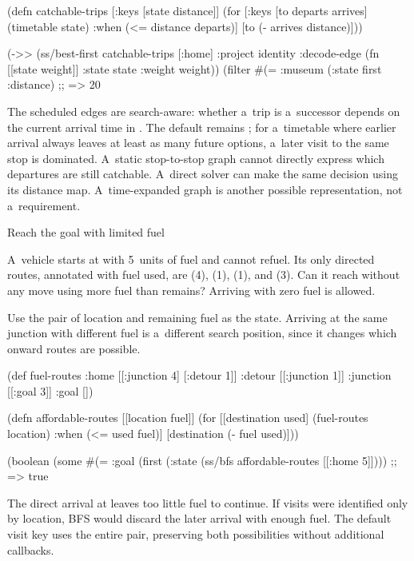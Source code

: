 {{{(defn catchable-trips [{:keys [state distance]}]
  (for [{:keys [to departs arrives]} (timetable state)
        :when (<= distance departs)]
    [to (- arrives distance)]))

(->> (ss/best-first catchable-trips [:home]
                        {:project identity
                         :decode-edge (fn [[state weight]]
                                        {:state state :weight weight})})
     (filter #(= :museum (:state %
     first
     :distance)
;; => 20
\endtt

The scheduled edges are search-aware: whether a~trip is a~successor depends
on the current arrival time in . The default
 remains ; for a~timetable where earlier arrival
always leaves at least as many future options, a~later visit to the same stop
is dominated. A~static stop-to-stop graph cannot directly express which
departures are still catchable. A~direct solver can make the same decision
using its distance map. A~time-expanded
graph is another possible representation, not a~requirement.

\secc Reach the goal with limited fuel

 A~vehicle starts at  with 5~units of
fuel and cannot refuel. Its only directed routes, annotated with fuel used,
are
 (4),  (1),
 (1), and  (3).
Can it reach  without any move using more fuel than remains?
Arriving with zero fuel is allowed.

\smallskip
{} Use the pair of location and remaining fuel as
the state. Arriving at the same junction with different fuel is a~different
search position, since it changes which onward routes are possible.

\begtt {}
(def fuel-routes
  {:home [[:junction 4] [:detour 1]]
   :detour [[:junction 1]]
   :junction [[:goal 3]]
   :goal []})

(defn affordable-routes [[location fuel]]
  (for [[destination used] (fuel-routes location)
        :when (<= used fuel)]
    [destination (- fuel used)]))

(boolean
 (some #(= :goal (first (:state %
       (ss/bfs affordable-routes [[:home 5]])))
;; => true
\endtt

The direct arrival at  leaves too little fuel to continue.
If visits were identified only by location, BFS would discard the later
arrival with enough fuel. The default visit key uses the entire pair,
preserving both possibilities without additional callbacks.

}}}

